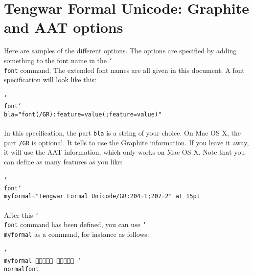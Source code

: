 \documentclass[11pt,a4paper]{article}
\begin{document}
\section{Tengwar Formal Unicode: Graphite and AAT options}

Here are samples of the different options. The options are specified by adding something to the font name in the \texttt{\char`\\font} command. The extended font names are all given in this document. A font specification will look like this:

\paragraph{} \texttt{\char`\\font\char`\\bla="font(/GR):feature=value(;feature=value)"}

\paragraph{} In this specification, the part \texttt{bla} is a string of your choice. On Mac OS X, the part \texttt{/GR} is optional. It tells \XeTeX{} to use the Graphite information. If you leave it away, it will use the AAT information, which only works on Mac OS X. Note that you can define as many features as you like:

\paragraph{} \texttt{\char`\\font\char`\\myformal="Tengwar Formal Unicode/GR:204=1;207=2" at 15pt}

\paragraph{} After this \texttt{\char`\\font} command has been defined, you can use \texttt{\char`\\myformal} as a command, for instance as follows:

\paragraph{} \texttt{\char`\\myformal   \char`\\normalfont}
\end{document}
